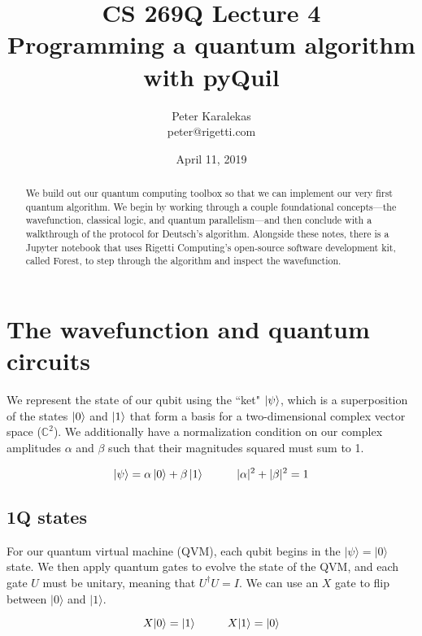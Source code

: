 \documentclass[12pt, letterpaper]{article}
\title{CS 269Q Lecture 4 \\ \large Programming a quantum algorithm with pyQuil\vspace{-1ex}}
\author{Peter Karalekas \\ \small peter@rigetti.com}
\date{\normalsize April 11, 2019\vspace{-3ex}}
\begin{document}
\maketitle

\begin{abstract}
\noindent
We build out our quantum computing toolbox so that we can implement our very first quantum algorithm. We begin by working through a couple foundational concepts—the wavefunction, classical logic, and quantum parallelism—and then conclude with a walkthrough of the protocol for Deutsch's algorithm. Alongside these notes, there is a Jupyter notebook that uses Rigetti Computing's open-source software development kit, called Forest, to step through the algorithm and inspect the wavefunction.
\end{abstract}

\section{The wavefunction and quantum circuits}

We represent the state of our qubit using the ``ket" $\ket{\psi}$, which is a superposition of the states $\ket{0}$ and $\ket{1}$ that form a
basis for a two-dimensional complex vector space ($\mathbb{C}^2$). We additionally have a normalization condition on our complex amplitudes $\alpha$ and $\beta$ such that their magnitudes squared must sum to 1.

\begin{equation}
\ket{\psi} = \alpha \ket{0} + \beta \ket{1} \hspace{1 cm} |\alpha|^2 + |\beta|^2 = 1
\end{equation}

\subsection{1Q states}

For our quantum virtual machine (QVM), each qubit begins in the $|\psi\rangle = |0\rangle$ state. We then apply quantum gates to evolve the state of the QVM, and each gate $U$ must be unitary, meaning that $U^{\dag}U = I$. We can use an $X$ gate to flip between $|0\rangle$ and $|1\rangle$.

\begin{equation}
X|0\rangle = |1\rangle \hspace{1 cm} X|1\rangle = |0\rangle \vspace{3 mm}
\end{equation}
\end{document}
